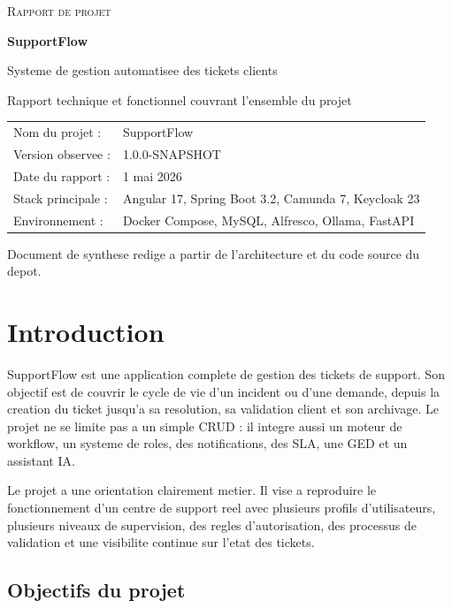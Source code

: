 \documentclass[12pt,a4paper]{article}
\begin{document}
\begin{titlepage}
  \centering
  {\scshape\LARGE Rapport de projet \par}
  \vspace{1.5cm}
  {\Huge\bfseries SupportFlow\par}
  \vspace{0.6cm}
  {\Large Systeme de gestion automatisee des tickets clients\par}
  \vspace{1.5cm}
  {\large Rapport technique et fonctionnel couvrant l'ensemble du projet\par}
  \vspace{2cm}
  \begin{tabular}{ll}
    Nom du projet : & SupportFlow \\
    Version observee : & 1.0.0-SNAPSHOT \\
    Date du rapport : & 1 mai 2026 \\
    Stack principale : & Angular 17, Spring Boot 3.2, Camunda 7, Keycloak 23 \\
    Environnement : & Docker Compose, MySQL, Alfresco, Ollama, FastAPI \\
  \end{tabular}
  \vfill
  {\large Document de synthese redige a partir de l'architecture et du code source du depot. \par}
\end{titlepage}

\tableofcontents
\newpage

\section{Introduction}

SupportFlow est une application complete de gestion des tickets de support. Son objectif est de couvrir le cycle de vie d'un incident ou d'une demande, depuis la creation du ticket jusqu'a sa resolution, sa validation client et son archivage. Le projet ne se limite pas a un simple CRUD : il integre aussi un moteur de workflow, un systeme de roles, des notifications, des SLA, une GED et un assistant IA.

Le projet a une orientation clairement metier. Il vise a reproduire le fonctionnement d'un centre de support reel avec plusieurs profils d'utilisateurs, plusieurs niveaux de supervision, des regles d'autorisation, des processus de validation et une visibilite continue sur l'etat des tickets.

\subsection{Objectifs du projet}
\end{document}

